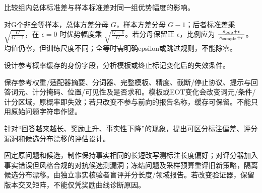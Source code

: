 \begin{exercises}
\begin{exercise}\optional 比较组内总体标准差与样本标准差对同一组优势幅度的影响。

\begin{solution}
对G个非全等样本，总体方差分母 $G$，样本方差分母 $G-1$；后者标准差乘 $\sqrt{\frac{G}{G-1}}$，在 $\epsilon=0$ 时优势幅度乘 $\sqrt{\frac{G-1}{G}}$。若分母保留正 $\epsilon$，比例应为 $\frac{s_{\rm pop}+\epsilon}{s_{\rm sample}+\epsilon}$。均值仍零，但训练尺度不同；全等时需明确epsilon或跳过规则，不能除零。
\end{solution}
\end{exercise}

\begin{exercise} 设计参考概率缓存的身份字段，分析模板或终止标记变化后的失效条件。

\begin{solution}
保存参考权重/适配器摘要、分词器、完整模板、精度、截断/停止协议、提示与回答词元、计分掩码、位置/可见性及是否求和。模板或EOT变化会改变词元/条件/计分区域，原概率即失效；若只改变不参与前向的报告名称，缓存可保留。不能只用原始问题字符串作键。
\end{solution}
\end{exercise}

\begin{exercise} 针对“回答越来越长、奖励上升、事实性下降”的现象，提出可区分标注偏差、评分漏洞和候选分布漂移的评估设计。

\begin{solution}
固定原问题和候选，制作保持事实相同的长短改写测标注长度偏好；对评分器加入事实错误但风格合规的对抗候选测漏洞；冻结问题及采样预算重评旧新策略，隔离候选分布漂移。由独立事实核验者盲评并分长度/领域报告。若改变验证器，保留版本交叉矩阵，不能仅凭奖励曲线诊断原因。
\end{solution}
\end{exercise}

\end{exercises}
